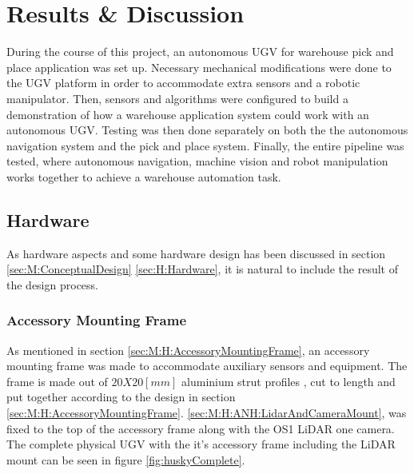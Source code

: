 \chapter{Results \& Discussion}\label{sec:ResultsAndDiscussion}

During the course of this project, an autonomous UGV for warehouse pick and place application was set up. Necessary mechanical modifications were done to the UGV platform in order to accommodate extra sensors and a robotic manipulator. Then, sensors and algorithms were configured to build a demonstration of how a warehouse application system could work with an autonomous UGV. Testing was then done separately on both the the autonomous navigation system and the pick and place system. Finally, the entire pipeline was tested, where autonomous navigation, machine vision and robot manipulation works together to achieve a warehouse automation task.

\section{Hardware}\label{R&D:Hardware}
As hardware aspects and some hardware design has been discussed in section \ref{sec:M:ConceptualDesign} \ref{sec:H:Hardware}, it is natural to include the result of the design process.

\subsection{Accessory Mounting Frame}\label{sec:R&D:H:AccessoryMountingFrame}
As mentioned in section \ref{sec:M:H:AccessoryMountingFrame}, an accessory mounting frame was made to accommodate auxiliary sensors and equipment. The frame is made out of $20X20[mm]$ aluminium strut profiles \cite{boshRexrothAluminium}, cut to length and put together according to the design in section \ref{sec:M:H:AccessoryMountingFrame}. \ref{sec:M:H:ANH:LidarAndCameraMount}, was fixed to the top of the accessory frame along with the OS1 LiDAR one camera. The complete physical UGV with the it's accessory frame including the LiDAR mount can be seen in figure \ref{fig:huskyComplete}.

